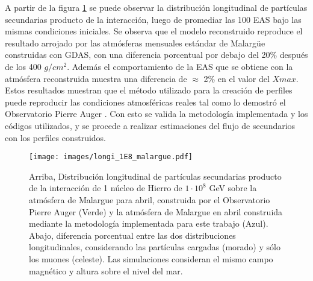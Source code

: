 A partir de la figura \ref{fig:fig18} se puede observar la distribución longitudinal de partículas secundarias producto de la interacción, luego de promediar las 100 EAS bajo las mismas condiciones iniciales. Se observa que el modelo reconstruido reproduce el resultado arrojado por las atmósferas mensuales estándar de Malarg\"ue construidas con GDAS, con una diferencia porcentual por debajo del 20$\%$ después de los 400 $g/cm^{2}$. Además el comportamiento de la EAS que se obtiene con la atmósfera reconstruida muestra una diferencia de $\approx$ 2$\%$ en el valor del $X{max}$.\\

Estos resultados muestran que el método utilizado para la creación de perfiles puede reproducir las condiciones atmosféricas reales tal como lo demostró el Observatorio Pierre Auger \cite{GDAS_Auger}. Con esto se valida la metodología implementada y los códigos utilizados,  y se procede a realizar estimaciones del flujo de secundarios con los perfiles construidos.\\

  \begin{figure}[htb!]
\centering
\texttt{[image: images/longi\_1E8\_malargue.pdf]}
\caption[Distribución longitudinal de secundarios sobre Malarg\"ue.]{Arriba, Distribución longitudinal de partículas secundarias producto de la interacción de 1 núcleo de Hierro de $1\cdot 10^{8}$ GeV sobre la atmósfera de Malargue para abril, construida por el Observatorio Pierre Auger (Verde) y la atmósfera de Malargue en abril construida mediante la metodología implementada para este trabajo (Azul). Abajo, diferencia porcentual entre las dos distribuciones longitudinales, considerando las partículas cargadas (morado) y sólo los muones (celeste). Las simulaciones consideran el mismo campo magnético y altura sobre el nivel del mar.}
 \label{fig:fig18}
 \end{figure}\\